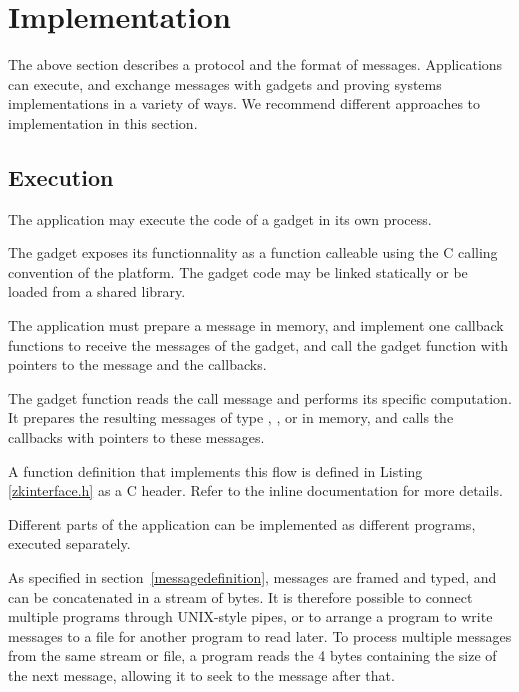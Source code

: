 \section{Implementation}
\label{sec:implementation}

The above section describes a protocol and the format of messages.
Applications can execute, and exchange messages with
gadgets and proving systems implementations in a variety of ways.
We recommend different approaches to implementation in this section.


\subsection{Execution}

\label{inmemory}
The application may execute the code of a gadget in its own process.

The gadget exposes its functionnality as a function calleable using the C calling convention of the platform. The gadget code may be linked statically or be loaded from a shared library.

The application must prepare a  message in memory, and implement one callback functions to receive the messages of the gadget,
and call the gadget function with pointers to the message and the callbacks.

The gadget function reads the call message and performs its specific computation. It prepares the resulting messages of type
, , or 
in memory, and calls the callbacks with pointers to these messages.

A function definition that implements this flow is defined in Listing \ref{zkinterface.h} as a C header. Refer to the inline documentation for more details.



Different parts of the application can be implemented as different
programs, executed separately.

As specified in section~\ref{messagedefinition}, messages are framed and typed,
and can be concatenated in a stream of bytes. It is therefore possible to connect multiple programs through UNIX-style pipes, or to arrange a program to write messages to a file for another program to read later.
To process multiple messages from the same stream or file, a program
reads the 4 bytes containing the size of the next message, allowing it to seek
to the message after that.

